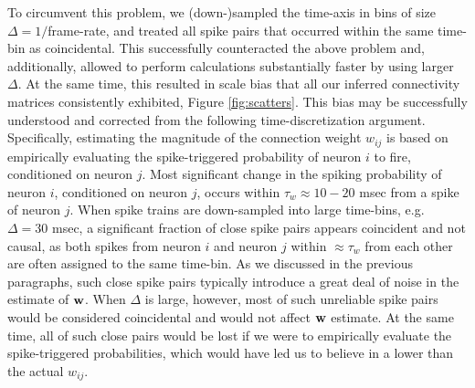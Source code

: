 To circumvent this problem, we (down-)sampled the time-axis in bins of size $\Delta=1/$frame-rate, and treated all spike pairs that occurred within the same time-bin as coincidental. This successfully counteracted the above problem and, additionally, allowed to perform calculations substantially faster by using larger $\Delta$. At the same time, this resulted in scale bias that all our inferred  connectivity matrices consistently exhibited, Figure \ref{fig:scatters}. This bias may be successfully understood and corrected from the following time-discretization argument.
Specifically, estimating the magnitude of the connection weight $w_{ij}$ is based on empirically evaluating the spike-triggered probability of neuron $i$ to fire, conditioned on neuron $j$. Most significant change in the spiking probability of neuron $i$, conditioned on neuron $j$, occurs within $\tau_w \approx 10-20$ msec from a spike of neuron $j$. 
When spike trains are down-sampled into large time-bins, e.g. $\Delta = 30$ msec, a significant fraction of close spike pairs appears coincident and not causal, as both spikes from neuron $i$ and neuron $j$ within $\approx \tau_w$ from each other are often assigned to the same time-bin.
As we discussed in the previous paragraphs, such close spike pairs typically introduce a great deal of noise in the estimate of $\mathbf{w}$.
When $\Delta$ is large, however, most of such unreliable spike pairs would be considered coincidental and would not affect $\mathbf{w}$ estimate. At the same time, all of such close pairs would be lost if we were to empirically evaluate the spike-triggered probabilities, which would have led us to believe in a lower than the actual  $w_{ij}$.


%


